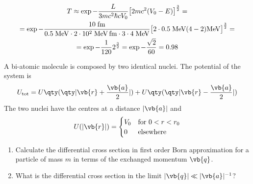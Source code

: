 \begin{soluzione}
   \begin{gather*}
      T
      \approx \exp{ - \frac{L}{3 mc^2 \hbar c V_0} \bigl[ 2 mc^2 (V_0 - E) \bigr]^{\frac{3}{2}} }
      =\\
      =\rm \exp{ - \frac{10 \; fm}{0.5 \; MeV \cdot 2 \cdot 10^2 \; MeV \, fm \cdot 3 \cdot 4 \; MeV} \bigl[ 2 \cdot 0.5 \; MeV (4 - 2) MeV \bigr]^{\frac{3}{2}} }
      =\\
      =\exp{ -\frac{1}{120} 2^{\frac{3}{2}} }
      =\exp{-\frac{\sqrt{2}}{60}}
      =0.98
   \end{gather*}
\end{soluzione}

\newpage
\setcounter{equation}{0}

\begin{esercizio}
   A bi-atomic molecule is composed by two identical nuclei. The potential of the system is
   \begin{equation*}
      U_{\rm tot}=U\qty( \qty| \vb{r} + \frac{\vb{a}}{2} | ) + U\qty( \qty| \vb{r} - \frac{\vb{a}}{2} | )
   \end{equation*}
   The two nuclei have the centres at a distance $|\vb{a}|$ and
   \begin{equation*}
      U(|\vb{r}|)=
      \begin{cases}
         V_0 & \text{for } 0<r<r_0\\
         0 & \text{elsewhere}
      \end{cases}
   \end{equation*}
   \begin{enumerate}[label=\alph*), leftmargin=0.6cm]
      \item Calculate the differential cross section in first order Born approximation for a particle of mass $m$ in terms of the exchanged momentum $\vb{q}$.
      \item What is the differential cross section in the limit $|\vb{q}| \ll |\vb{a}|^{-1}$?
   \end{enumerate}
\end{esercizio}
